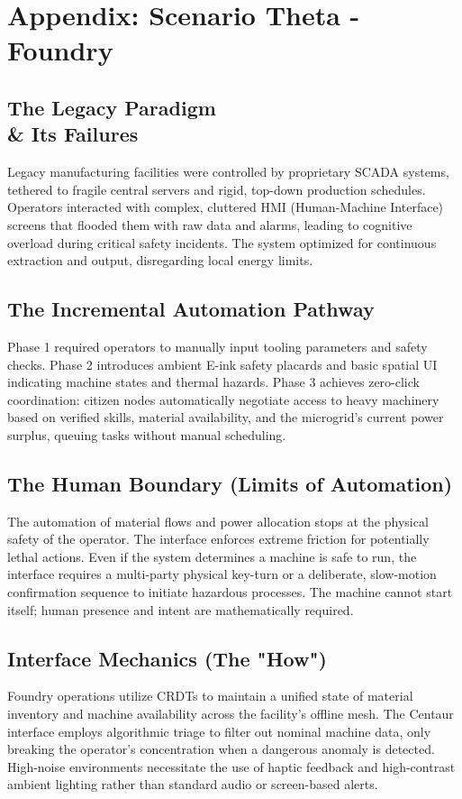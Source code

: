 \chapter{Appendix: Scenario Theta - Foundry}

\section{The Legacy Paradigm \\\& Its Failures}
Legacy manufacturing facilities were controlled by proprietary SCADA systems, tethered to fragile central servers and rigid, top-down production schedules. Operators interacted with complex, cluttered HMI (Human-Machine Interface) screens that flooded them with raw data and alarms, leading to cognitive overload during critical safety incidents. The system optimized for continuous extraction and output, disregarding local energy limits.

\section{The Incremental Automation Pathway}
Phase 1 required operators to manually input tooling parameters and safety checks. Phase 2 introduces ambient E-ink safety placards and basic spatial UI indicating machine states and thermal hazards. Phase 3 achieves zero-click coordination: citizen nodes automatically negotiate access to heavy machinery based on verified skills, material availability, and the microgrid's current power surplus, queuing tasks without manual scheduling.

\section{The Human Boundary (Limits of Automation)}
The automation of material flows and power allocation stops at the physical safety of the operator. The interface enforces extreme friction for potentially lethal actions. Even if the system determines a machine is safe to run, the interface requires a multi-party physical key-turn or a deliberate, slow-motion confirmation sequence to initiate hazardous processes. The machine cannot start itself; human presence and intent are mathematically required.

\section{Interface Mechanics (The "How")}
Foundry operations utilize CRDTs to maintain a unified state of material inventory and machine availability across the facility's offline mesh. The Centaur interface employs algorithmic triage to filter out nominal machine data, only breaking the operator's concentration when a dangerous anomaly is detected. High-noise environments necessitate the use of haptic feedback and high-contrast ambient lighting rather than standard audio or screen-based alerts.

